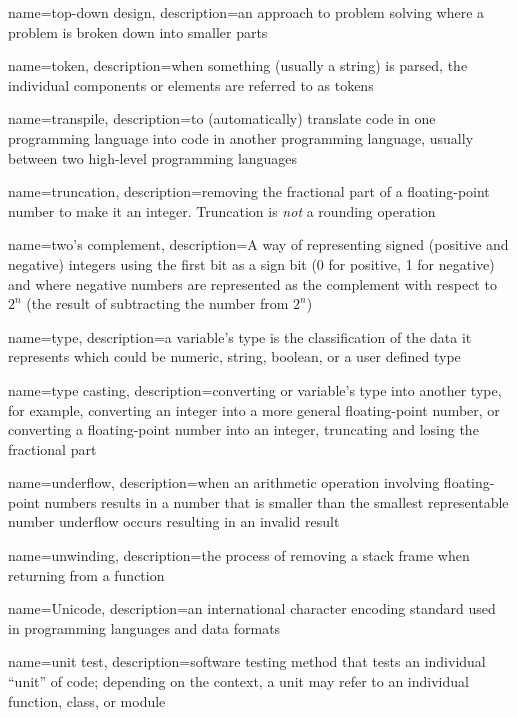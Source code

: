 {
  name=top-down design,
  description={an approach to problem solving where a problem is broken down into smaller parts}
}

{
  name=token,
  description={when something (usually a string) is parsed, the individual components or elements are referred to as tokens}
}

{
  name=transpile,
  description={to (automatically) translate code in one programming language into code in another programming language, usually between two high-level programming languages}
}

{
  name=truncation,
  description={removing the fractional part of a floating-point number to make it an integer.  Truncation is \emph{not} a 
  	rounding operation}
}

{
  name=two's complement,
  description={A way of representing signed (positive and negative) integers using the first bit as a sign bit (0 for positive, 1 for negative) and where negative numbers are represented as the complement with respect to $2^n$ (the result of subtracting the number from $2^n$) }
}

{
  name=type,
  description={a variable's type is the classification of the data it represents which could be numeric, string, boolean, or
  	a user defined type}
}

{
  name=type casting,
  description={converting or variable's type into another type, for example, converting an integer into a more general floating-point number, or
  	converting a floating-point number into an integer, truncating and losing the fractional part}
}

{
  name=underflow,
  description={when an arithmetic operation involving floating-point numbers results in a number that is smaller than the smallest representable
  number underflow occurs resulting in an invalid result}
}

{
  name=unwinding,
  description={the process of removing a stack frame when returning from a function}
}

{
  name=Unicode,
  description={an international character encoding standard used in programming languages and data formats}
}

{
  name=unit test,
  description={software testing method that tests an individual ``unit'' of code; depending on the context, a unit may refer to an individual function, class, or module}
}


